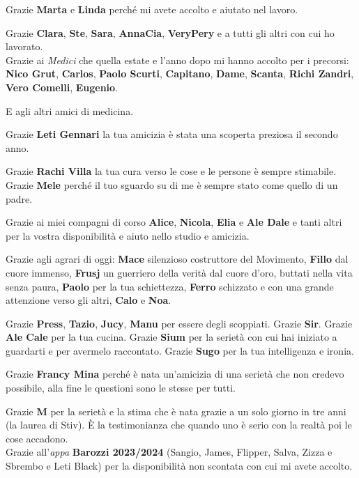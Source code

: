 Grazie \textbf{Marta} e \textbf{Linda} perché mi avete accolto e aiutato nel lavoro.

Grazie \textbf{Clara}, \textbf{Ste}, \textbf{Sara}, \textbf{AnnaCia}, \textbf{VeryPery} e a tutti gli altri con cui ho lavorato. \\


Grazie ai \textit{Medici} che quella estate e l'anno dopo mi hanno accolto per i precorsi: \textbf{Nico Grut}, \textbf{Carlos}, \textbf{Paolo Scurti}, \textbf{Capitano}, \textbf{Dame}, \textbf{Scanta}, \textbf{Richi Zandri}, \textbf{Vero Comelli}, \textbf{Eugenio}.

E agli altri amici di medicina.

Grazie \textbf{Leti Gennari} la tua amicizia è stata una scoperta preziosa il secondo anno.

Grazie \textbf{Rachi Villa} la tua cura verso le cose e le persone è sempre stimabile. \\

Grazie \textbf{Mele} perché il tuo sguardo su di me è sempre stato come quello di un padre.

Grazie ai miei compagni di corso \textbf{Alice}, \textbf{Nicola}, \textbf{Elia} e \textbf{Ale Dale} e tanti altri per la vostra disponibilità e aiuto nello studio e amicizia.

Grazie agli agrari di oggi: \textbf{Mace} silenzioso costruttore del Movimento, \textbf{Fillo} dal cuore immenso, \textbf{Frusj} un guerriero della verità dal cuore d'oro, buttati nella vita senza paura, \textbf{Paolo} per la tua schiettezza, \textbf{Ferro} schizzato e con una grande attenzione verso gli altri, \textbf{Calo} e \textbf{Noa}.

Grazie \textbf{Press}, \textbf{Tazio}, \textbf{Jucy}, \textbf{Manu} per essere degli scoppiati. Grazie \textbf{Sir}. Grazie \textbf{Ale Cale} per la tua cucina. Grazie \textbf{Sium} per la serietà con cui hai iniziato a guardarti e per avermelo raccontato. Grazie \textbf{Sugo} per la tua intelligenza e ironia.

Grazie \textbf{Francy Mina} perché è nata un'amicizia di una serietà che non credevo possibile, alla fine le questioni sono le stesse per tutti.

Grazie \textbf{M} per la serietà e la stima che è nata grazie a un solo giorno in tre anni (la laurea di Stiv). È la testimonianza che quando uno è serio con la realtà poi le cose accadono. \\


Grazie all'\textit{appa} \textbf{Barozzi 2023/2024} (Sangio, James, Flipper, Salva, Zizza e Sbrembo e Leti Black) per la disponibilità non scontata con cui mi avete accolto.

